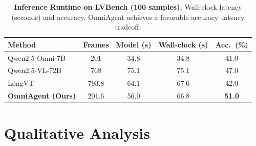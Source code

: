 \documentclass{article}
\theoremstyle{plain}
\theoremstyle{definition}
\theoremstyle{remark}
\begin{document}
\begin{table}[h!]
\caption{\textbf{Inference Runtime on LVBench (100 samples).} Wall-clock
latency (seconds) and accuracy. OmniAgent achieves a favorable
accuracy--latency tradeoff.}
\label{tab:runtime}
\vskip 0.1in
\begin{center}
\small
\setlength{\tabcolsep}{8pt}
\renewcommand{\arraystretch}{1.15}
\begin{tabular}{l c c c c}
\toprule
\textbf{Method} & \textbf{Frames} & \textbf{Model (s)} & \textbf{Wall-clock (s)} & \textbf{Acc.\ (\%)} \\
\midrule
Qwen2.5-Omni-7B & 201 & 34.8 & 34.8 & 41.0 \\
Qwen2.5-VL-72B & 768 & 75.1 & 75.1 & 47.0 \\
LongVT & 793.8 & 64.1 & 67.6 & 42.0 \\
\textbf{OmniAgent (Ours)} & 201.6 & 56.0 & 66.8 & \textbf{51.0} \\
\bottomrule
\end{tabular}
\end{center}
\vskip -0.1in
\end{table}

\section{Qualitative Analysis}
\label{app:qualitative}
\end{document}

